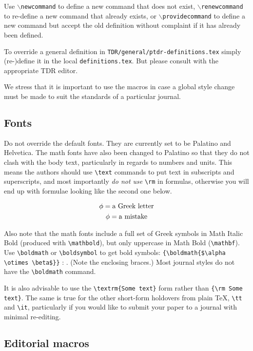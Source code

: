 Use {$\backslash$\texttt{newcommand}} to define a new command that does not exist,
{$\backslash$\texttt{renewcommand}} to re-define a new command that already exists,
or {$\backslash$\texttt{providecommand}} to define a new command but accept the old
definition without complaint if it has already been defined.

To override a general definition in \texttt{TDR/general/ptdr-definitions.tex}
simply (re-)define it in the local \texttt{definitions.tex}. But please
consult with the appropriate TDR editor.

We stress that it is important to use the macros in case a global style change must be made to suit the standards of a particular journal.

\subsection{Fonts}
Do not override the default fonts. They are currently set to be
Palatino and Helvetica. The math fonts have also been changed to
Palatino so that they do not clash with the body text,
particularly in regards to numbers and units. This means the
authors should use \verb|\text| commands to put text in subscripts
and superscripts, and most importantly \emph{do not use}
\verb|\rm| in formulas, otherwise you will end up with formulae looking like the second one below.

\begin{gather}
\phi = \text{a Greek letter}\\
{\rm \phi} = \text{a mistake}
\end{gather}

Also note that the math fonts include a full set of Greek symbols in Math Italic Bold (produced with \verb|\mathbold|),
but only uppercase in Math Bold (\verb|\mathbf|). Use \verb|\boldmath| or \verb|\boldsymbol| to get bold symbols: \verb|{\boldmath{$\alpha \otimes \beta$}}| : {\boldmath{$\alpha \otimes \beta$}}. (Note the enclosing braces.) Most journal styles do not have the \verb|\boldmath| command.



It is also advisable to use the \verb|\textrm{Some text}| form rather than
\verb|{\rm Some text}|. The same is true for the other short-form holdovers from plain \TeX,
\verb|\tt| and \verb|\it|, particularly if you would like to submit your paper to a journal
with minimal re-editing.

\subsection{Editorial macros}


